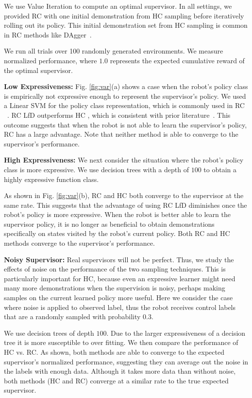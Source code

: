 \documentclass[10pt, conference]{ieeeconf}      %
\begin{document}
We use Value Iteration to compute an optimal supervisor. In all settings, we provided RC with one initial demonstration from HC sampling before iteratively rolling out its policy. This initial demonstration set from HC sampling is common in RC methods like DAgger~\cite{ross2010reduction}.

We run all trials over 100 randomly generated environments.
We measure normalized performance, where $1.0$ represents the expected cumulative reward of the optimal supervisor.

\noindent \textbf{Low Expressiveness:} Fig. \ref{fig:var}(a) shows a case when the robot's policy class is empirically not expressive enough to represent the supervisor's policy.
We used a Linear SVM for the policy class representation, which is commonly used in RC ~\cite{ross2010efficient,ross2010reduction,ross2013learning}. RC LfD outperforms HC , which is consistent with prior literature~\cite{ross2010efficient,ross2010reduction}.
This outcome suggests that when the robot is not able to learn the supervisor's policy, RC has a large advantage. Note that neither method is able to converge to the supervisor's performance. 

\noindent \textbf{High Expressiveness:}
We next consider the situation where the robot's policy class is more expressive. We use decision trees with a depth of $100$ to obtain a highly expressive function class. 

As shown in Fig. \ref{fig:var}(b), RC and HC both converge to the supervisor at the same rate. This suggests that the advantage of using RC LfD diminishes once the robot's policy is more expressive. When the robot is better able to learn the supervisor policy, it is no longer as beneficial to obtain demonstrations specifically on states visited by the robot's current policy. Both RC and HC methods converge to the supervisor's performance. 


\noindent \textbf{Noisy Supervisor:}
Real supervisors will not be perfect. Thus, we study the effects of noise on the performance of the two sampling techniques. This is particularly important for HC, because even an expressive learner might need many more demonstrations when the supervision is noisy, perhaps making samples on the current learned policy more useful. Here we consider the case where noise is applied to observed label, thus the robot receives control labels that are  a randomly sampled with probability $0.3$.

We use decision trees of depth $100$. Due to the larger expressiveness of a decision tree it is more susceptible to over fitting.  We then compare the performance of HC vs. RC. As shown, both methods are able to converge to the expected supervisor's normalized performance, suggesting they can average out the noise in the labels with enough data. Although it takes more data than without noise, both methods (HC and RC) converge at a similar rate to the true expected supervisor. 
\end{document}

